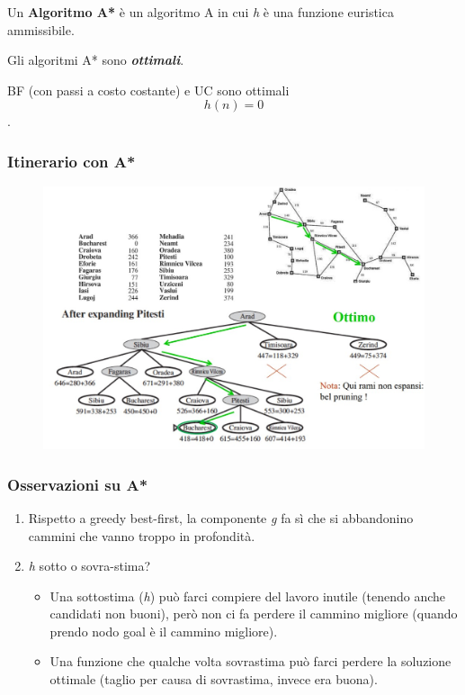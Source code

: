 \begin{definition}
	Un \textbf{Algoritmo A*} è un algoritmo A in cui \textit{h} è una funzione euristica ammissibile.\
\end{definition}

\begin{theorem}
	Gli algoritmi A* sono \textbf{\textit{ottimali}}.
\end{theorem}

\begin{corollario}
	BF (con passi a costo costante) e UC sono ottimali \[h(n)=0\].\
\end{corollario}

\subsubsection{Itinerario con A*}
\begin{figure}[H]
	\centering
	\includegraphics[width=\textwidth]{immagini/ItinerarioA.jpg}
\end{figure}

\subsubsection{Osservazioni su A*}

\begin{enumerate}
	\item Rispetto a greedy best-first, la componente \textit{g} fa sì che si abbandonino cammini che vanno troppo in profondità.
	\item \textit{h} sotto o sovra-stima?
	      \begin{itemize}
		      \item Una sottostima (\textit{h}) può farci compiere del lavoro inutile (tenendo anche candidati non buoni), però non ci fa perdere il cammino migliore (quando prendo nodo goal è il cammino migliore).
		      \item Una funzione che qualche volta sovrastima può farci perdere la soluzione ottimale (taglio per causa di sovrastima, invece era buona).
	      \end{itemize}
\end{enumerate}

